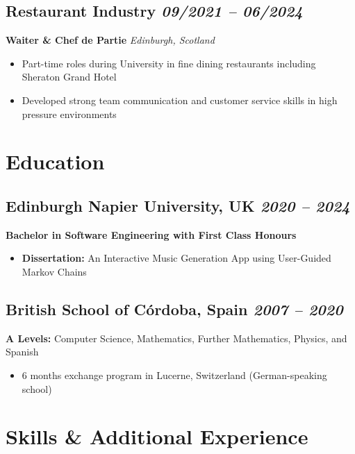 \documentclass[11pt,a4paper]{article}
\begin{document}
\subsection{Restaurant Industry \hfill \textit{09/2021 -- 06/2024}}
\textbf{Waiter \& Chef de Partie} \hfill \textit{Edinburgh, Scotland}
\begin{itemize}
    \item Part-time roles during University in fine dining restaurants including Sheraton Grand Hotel
    \item Developed strong team communication and customer service skills in high pressure environments
\end{itemize}

\section{Education}

\subsection{Edinburgh Napier University, UK \hfill \textit{2020 -- 2024}}
\textbf{Bachelor in Software Engineering with First Class Honours}
\begin{itemize}
    \item \textbf{Dissertation:} An Interactive Music Generation App using User-Guided Markov Chains
\end{itemize}

\subsection{British School of Córdoba, Spain \hfill \textit{2007 -- 2020}}
\textbf{A Levels:} Computer Science, Mathematics, Further Mathematics, Physics, and Spanish
\begin{itemize}
    \item 6 months exchange program in Lucerne, Switzerland (German-speaking school)
\end{itemize}

\section{Skills \& Additional Experience}
\end{document}
